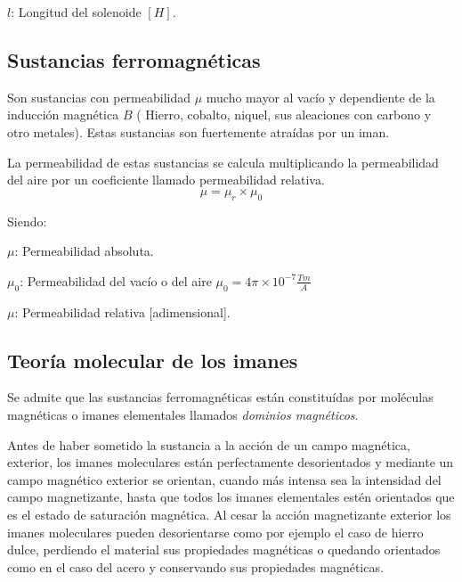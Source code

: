 \documentclass[../main]{subfiles}
\begin{document}
$l$: Longitud del solenoide $[H]$.

\subsection{Sustancias ferromagnéticas}

Son sustancias con permeabilidad $\mu$ mucho mayor al vacío y dependiente de la inducción magnética $B$ ( Hierro, cobalto, niquel, sus aleaciones con carbono y otro metales). Estas sustancias son fuertemente atraídas por un iman.

La permeabilidad de estas sustancias se calcula multiplicando la permeabilidad del aire por un coeficiente llamado permeabilidad relativa.
\begin{equation}
    \mu=\mu_r \times \mu_0
\end{equation}

Siendo:

$\mu$: Permeabilidad absoluta.

$\mu_0$: Permeabilidad del vacío o del aire $\mu_0 = 4 \pi \times 10^{-7} \frac{Tm}{A}$

$\mu$: Permeabilidad relativa [adimensional].

\subsection{Teoría molecular de los imanes}

Se admite que las sustancias ferromagnéticas están constituídas por moléculas magnéticas o imanes elementales llamados \emph{dominios magnéticos}.

Antes de haber sometido la sustancia a la acción de un campo magnética, exterior, los imanes moleculares están perfectamente desorientados y mediante un campo magnético exterior se orientan, cuando más intensa sea la intensidad del campo magnetizante, hasta que todos los imanes elementales estén orientados que es el estado de saturación magnética.
Al cesar la acción magnetizante exterior los imanes moleculares pueden desorientarse como por ejemplo el caso de hierro dulce, perdiendo el material sus propiedades magnéticas o quedando orientados como en el caso del acero y conservando sus propiedades magnéticas.

\end{document}
